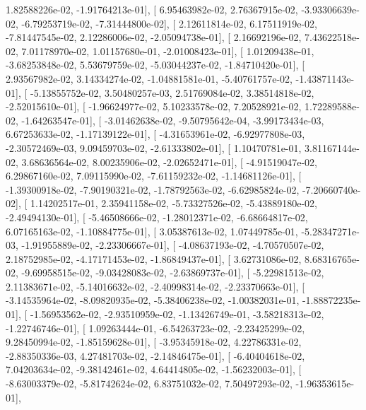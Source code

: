 \documentclass{article}
\begin{document}
          1.82588226e-02,  -1.91764213e-01],
       [  6.95463982e-02,   2.76367915e-02,  -3.93306639e-02,
         -6.79253719e-02,  -7.31444800e-02],
       [  2.12611814e-02,   6.17511919e-02,  -7.81447545e-02,
          2.12286006e-02,  -2.05094738e-01],
       [  2.16692196e-02,   7.43622518e-02,   7.01178970e-02,
          1.01157680e-01,  -2.01008423e-01],
       [  1.01209438e-01,  -3.68253848e-02,   5.53679759e-02,
         -5.03044237e-02,  -1.84710420e-01],
       [  2.93567982e-02,   3.14334274e-02,  -1.04881581e-01,
         -5.40761757e-02,  -1.43871143e-01],
       [ -5.13855752e-02,   3.50480257e-03,   2.51769084e-02,
          3.38514818e-02,  -2.52015610e-01],
       [ -1.96624977e-02,   5.10233578e-02,   7.20528921e-02,
          1.72289588e-02,  -1.64263547e-01],
       [ -3.01462638e-02,  -9.50795642e-04,  -3.99173434e-03,
          6.67253633e-02,  -1.17139122e-01],
       [ -4.31653961e-02,  -6.92977808e-03,  -2.30572469e-03,
          9.09459703e-02,  -2.61333802e-01],
       [  1.10470781e-01,   3.81167144e-02,   3.68636564e-02,
          8.00235906e-02,  -2.02652471e-01],
       [ -4.91519047e-02,   6.29867160e-02,   7.09115990e-02,
         -7.61159232e-02,  -1.14681126e-01],
       [ -1.39300918e-02,  -7.90190321e-02,  -1.78792563e-02,
         -6.62985824e-02,  -7.20660740e-02],
       [  1.14202517e-01,   2.35941158e-02,  -5.73327526e-02,
         -5.43889180e-02,  -2.49494130e-01],
       [ -5.46508666e-02,  -1.28012371e-02,  -6.68664817e-02,
          6.07165163e-02,  -1.10884775e-01],
       [  3.05387613e-02,   1.07449785e-01,  -5.28347271e-03,
         -1.91955889e-02,  -2.23306667e-01],
       [ -4.08637193e-02,  -4.70570507e-02,   2.18752985e-02,
         -4.17171453e-02,  -1.86849437e-01],
       [  3.62731086e-02,   8.68316765e-02,  -9.69958515e-02,
         -9.03428083e-02,  -2.63869737e-01],
       [ -5.22981513e-02,   2.11383671e-02,  -5.14016632e-02,
         -2.40998314e-02,  -2.23370663e-01],
       [ -3.14535964e-02,  -8.09820935e-02,  -5.38406238e-02,
         -1.00382031e-01,  -1.88872235e-01],
       [ -1.56953562e-02,  -2.93510959e-02,  -1.13426749e-01,
         -3.58218313e-02,  -1.22746746e-01],
       [  1.09263444e-01,  -6.54263723e-02,  -2.23425299e-02,
          9.28450994e-02,  -1.85159628e-01],
       [ -3.95345918e-02,   4.22786331e-02,  -2.88350336e-03,
          4.27481703e-02,  -2.14846475e-01],
       [ -6.40404618e-02,   7.04203634e-02,  -9.38142461e-02,
          4.64414805e-02,  -1.56232003e-01],
       [ -8.63003379e-02,  -5.81742624e-02,   6.83751032e-02,
          7.50497293e-02,  -1.96353615e-01],
\end{document}
